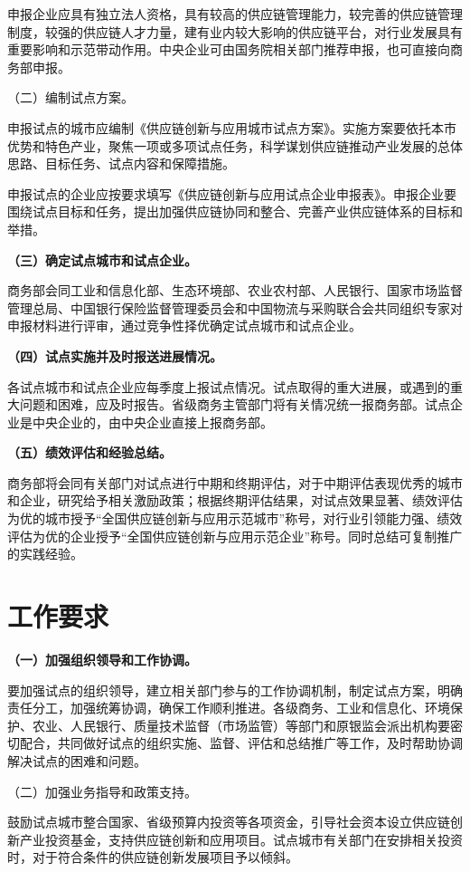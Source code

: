 申报企业应具有独立法人资格，具有较高的供应链管理能力，较完善的供应链管理制度，较强的供应链人才力量，建有业内较大影响的供应链平台，对行业发展具有重要影响和示范带动作用。中央企业可由国务院相关部门推荐申报，也可直接向商务部申报。

 （二）编制试点方案。

申报试点的城市应编制《供应链创新与应用城市试点方案》。实施方案要依托本市优势和特色产业，聚焦一项或多项试点任务，科学谋划供应链推动产业发展的总体思路、目标任务、试点内容和保障措施。

申报试点的企业应按要求填写《供应链创新与应用试点企业申报表》。申报企业要围绕试点目标和任务，提出加强供应链协同和整合、完善产业供应链体系的目标和举措。

{ \bf （三）确定试点城市和试点企业。 }

商务部会同工业和信息化部、生态环境部、农业农村部、人民银行、国家市场监督管理总局、中国银行保险监督管理委员会和中国物流与采购联合会共同组织专家对申报材料进行评审，通过竞争性择优确定试点城市和试点企业。

{ \bf （四）试点实施并及时报送进展情况。 }

各试点城市和试点企业应每季度上报试点情况。试点取得的重大进展，或遇到的重大问题和困难，应及时报告。省级商务主管部门将有关情况统一报商务部。试点企业是中央企业的，由中央企业直接上报商务部。

{ \bf （五）绩效评估和经验总结。 }

商务部将会同有关部门对试点进行中期和终期评估，对于中期评估表现优秀的城市和企业，研究给予相关激励政策；根据终期评估结果，对试点效果显著、绩效评估为优的城市授予“全国供应链创新与应用示范城市”称号，对行业引领能力强、绩效评估为优的企业授予“全国供应链创新与应用示范企业”称号。同时总结可复制推广的实践经验。

\section{工作要求}

{ \bf （一）加强组织领导和工作协调。 }

要加强试点的组织领导，建立相关部门参与的工作协调机制，制定试点方案，明确责任分工，加强统筹协调，确保工作顺利推进。各级商务、工业和信息化、环境保护、农业、人民银行、质量技术监督（市场监管）等部门和原银监会派出机构要密切配合，共同做好试点的组织实施、监督、评估和总结推广等工作，及时帮助协调解决试点的困难和问题。

 （二）加强业务指导和政策支持。

鼓励试点城市整合国家、省级预算内投资等各项资金，引导社会资本设立供应链创新产业投资基金，支持供应链创新和应用项目。试点城市有关部门在安排相关投资时，对于符合条件的供应链创新发展项目予以倾斜。

